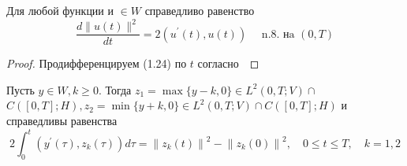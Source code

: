 \begin{lemma}
    \label{lm:1_7:32}
    Для любой функции и $\in W$ справедливо равенство
    \[
        \frac{d\|u(t)\|^{2}}{d t}=2\left(u^{\prime}(t),
        u(t)\right) \quad \text { n.8. нa }(0, T)
    \]
\end{lemma}

\begin{proof}
    Продифференцируем (1.24) по $t$ согласно~\cite[356]{Kolmogorov2004}
\end{proof}

\begin{lemma}
    \label{lm:1_7:33}
    Пусть $y \in W, k \geq 0$.
    Тогда $z_{1}=\max \{y-k, 0\} \in L^{2}(0, T ; V)
    \cap$ $C([0, T] ; H), z_{2}=
    \min \{y+k, 0\} \in L^{2}(0, T ; V) \cap C([0, T] ; H)$
    и справедливы равенства
    \[
        2 \int_{0}^{t}\left(y^{\prime}(\tau), z_{k}(\tau)\right) d \tau=
        \left\|z_{k}(t)\right\|^{2}
        -\left\|z_{k}(0)\right\|^{2}, \quad 0 \leq t \leq T, \quad k=1,2
    \]
\end{lemma}

